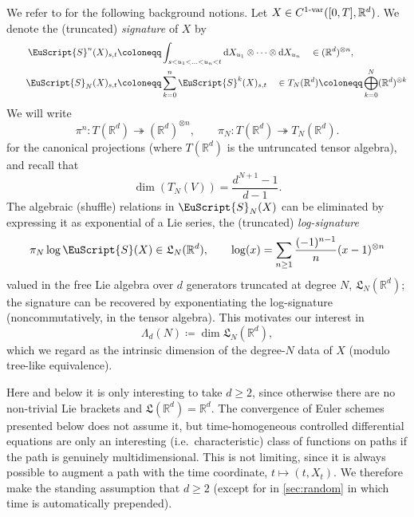 \documentclass{article}
\def\d{\mathrm{d}}
\newcommand{\var}[1]{{#1 \mathchar"2D \mathrm{var}}}
\def\Sig{\EuScript{S}}
\def\bbR{\mathbb{R}}
\numberwithin{equation}{section}
\theoremstyle{definition}
\theoremstyle{remark}
\begin{document}
We refer to \cite{FV10} for the following background notions. Let $X \in C^\var{1}([0,T],\mathbb R^d)$. We denote the (truncated) \emph{signature} of $X$ by
\begin{equation}\label{eq:sig}
	\begin{split}
		\Sig^{n}(X)_{s,t} &\coloneqq \int_{s < u_1 < \ldots < u_n < t} \d X_{u_1} \otimes \cdots \otimes \d X_{u_n} \quad\in (\mathbb R^d)^{\otimes n} , \\
		\qquad \Sig_{N}(X)_{s,t} &\coloneqq \sum_{k = 0}^n \Sig^{k}(X)_{s,t} \quad\in T_N(\mathbb R^d) \coloneqq \bigoplus_{k = 0}^N (\mathbb R^d)^{\otimes k}
	\end{split}
\end{equation}
We will write
\begin{equation}
	\pi^n \colon T(\bbR^d) \twoheadrightarrow (\bbR^d)^{\otimes n},\qquad \pi_N \colon T(\bbR^d) \twoheadrightarrow T_N(\bbR^d).
\end{equation}
for the canonical projections (where $T(\bbR^d)$ is the untruncated tensor algebra), and recall that
\begin{equation}\label{eq:dimT}
	\dim(T_N(V)) = \frac{d^{N+1} - 1}{d-1} .
\end{equation}
The algebraic (shuffle) relations in $\Sig_N(X)$ can be eliminated by expressing it as exponential of a Lie series, the (truncated) \emph{log-signature}
\begin{align*}
	\pi_N \log \Sig(X) \in \mathfrak L_N(\bbR^d), \qquad \log(x) = \sum_{n \geq 1} \frac{(-1)^{n-1}}{n} (x - 1)^{\otimes n}
\end{align*}
valued in the free Lie algebra over $d$ generators truncated at degree $N$, $\mathfrak L_N(\bbR^d)$; the signature can be recovered by exponentiating the log-signature (noncommutatively, in the tensor algebra). This motivates our interest in
\begin{equation}
\Lambda_d (N) \coloneqq \dim \mathfrak L_N (\bbR^d),
\end{equation}
which we regard as the intrinsic dimension of the degree-$N$ data of $X$ (modulo tree-like equivalence).

\begin{remark}
	Here and below it is only interesting to take $d \geq 2$, since otherwise there are no non-trivial Lie brackets and $\mathfrak L (\bbR^d) = \bbR^d$. The convergence of Euler schemes presented below does not assume it, but time-homogeneous controlled differential equations are only an interesting (i.e.\ characteristic) class of functions on paths if the path is genuinely multidimensional. This is not limiting, since it is always possible to augment a path with the time coordinate, $t \mapsto (t, X_t)$. We therefore make the standing assumption that $d \geq 2$ (except for in \autoref{sec:random} in which time is automatically prepended).
\end{remark}
\end{document}

